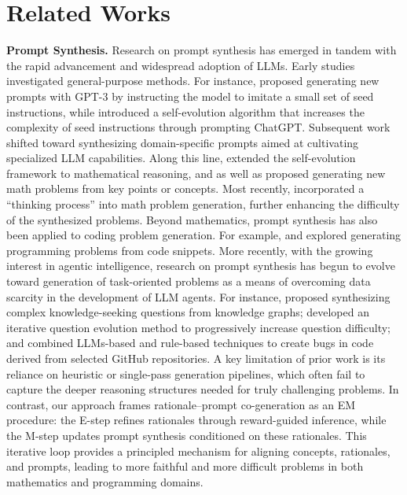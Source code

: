 \section{Related Works}
\textbf{Prompt Synthesis.} Research on prompt synthesis has emerged in tandem with the rapid advancement and widespread adoption of LLMs. Early studies investigated general-purpose methods. For instance, \citet{wang2023self} proposed generating new prompts with GPT-3 by instructing the model to imitate a small set of seed instructions, while \citet{xu2024wizardlm} introduced a self-evolution algorithm that increases the complexity of seed instructions through prompting ChatGPT. Subsequent work shifted toward synthesizing domain-specific prompts aimed at cultivating specialized LLM capabilities. Along this line, \citet{luo2023wizardmath} extended the self-evolution framework to mathematical reasoning, and \citet{huang2025key} as well as \citet{tang2024mathscale} proposed generating new math problems from key points or concepts. Most recently, \citet{zhao2025promptcot} incorporated a ``thinking process'' into math problem generation, further enhancing the difficulty of the synthesized problems. Beyond mathematics, prompt synthesis has also been applied to coding problem generation. For example, \citet{huang2024opencoder} and \citet{wei2023magicoder} explored generating programming problems from code snippets. More recently, with the growing interest in agentic intelligence, research on prompt synthesis has begun to evolve toward generation of task-oriented problems as a means of overcoming data scarcity in the development of LLM agents. For instance, \citet{li2025websailor} proposed synthesizing complex knowledge-seeking questions from knowledge graphs; \citet{liu2025webexplorer} developed an iterative question evolution method to progressively increase question difficulty; and \citet{yang2025swe} combined LLMs-based and rule-based techniques to create bugs in code derived from selected GitHub repositories.
A key limitation of prior work is its reliance on heuristic or single-pass generation pipelines, which often fail to capture the deeper reasoning structures needed for truly challenging problems.  
In contrast, our approach frames rationale–prompt co-generation as an EM procedure: the E-step refines rationales through reward-guided inference, while the M-step updates prompt synthesis conditioned on these rationales.  
This iterative loop provides a principled mechanism for aligning concepts, rationales, and prompts, leading to more faithful and more difficult problems in both mathematics and programming domains.


